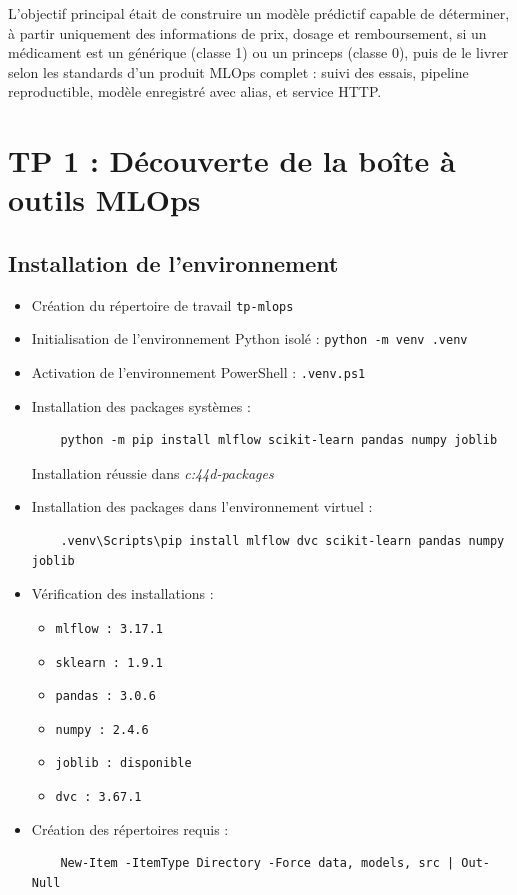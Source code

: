 \documentclass[12pt,a4paper]{report}
\begin{document}
L'objectif principal était de construire un modèle prédictif capable de déterminer, à partir uniquement des informations de prix, dosage et remboursement, si un médicament est un générique (classe 1) ou un princeps (classe 0), puis de le livrer selon les standards d'un produit MLOps complet : suivi des essais, pipeline reproductible, modèle enregistré avec alias, et service HTTP.

\chapter{TP 1 : Découverte de la boîte à outils MLOps}

\section{Installation de l'environnement}
\begin{itemize}
    \item Création du répertoire de travail \texttt{tp-mlops}
    \item Initialisation de l'environnement Python isolé : \texttt{python -m venv .venv}
    \item Activation de l'environnement PowerShell : \texttt{.venv\Scripts\Activate.ps1}
    \item Installation des packages systèmes :
    \begin{verbatim}
    python -m pip install mlflow scikit-learn pandas numpy joblib
    \end{verbatim}
    Installation réussie dans \textit{c:\users\s44d\appdata\roaming\python{}\site-packages}
    \item Installation des packages dans l'environnement virtuel :
    \begin{verbatim}
    .venv\Scripts\pip install mlflow dvc scikit-learn pandas numpy joblib
    \end{verbatim}
    \item Vérification des installations :
    \begin{itemize}
        \item \texttt{mlflow : 3.17.1}
        \item \texttt{sklearn : 1.9.1}
        \item \texttt{pandas : 3.0.6}
        \item \texttt{numpy : 2.4.6}
        \item \texttt{joblib : disponible}
        \item \texttt{dvc : 3.67.1}
    \end{itemize}
    \item Création des répertoires requis :
    \begin{verbatim}
    New-Item -ItemType Directory -Force data, models, src | Out-Null
    \end{verbatim}
\end{itemize}
\end{document}
